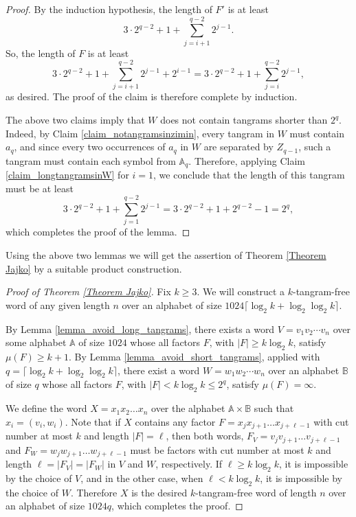 \documentclass[12pt]{amsart}
\theoremstyle{plain}
\numberwithin{equation}{section}
\begin{document}
\begin{proof}
	By the induction hypothesis, the length of $F'$ is at least $$3\cdot 2^{q-2} + 1 + \sum_{j=i+1}^{q-2}2^{j-1}.$$ So, the length of $F$ is at least $$3\cdot 2^{q-2} + 1 + \sum_{j=i+1}^{q-2}2^{j-1} + 2^{i-1} = 3\cdot 2^{q-2} + 1 + \sum_{j=i}^{q-2}2^{j-1},$$ as desired. The proof of the claim is therefore complete by induction.
	
	The above two claims imply that $W$ does not contain tangrams shorter than $2^q$. Indeed, by Claim \ref{claim_notangramsinzimin}, every tangram in $W$ must contain $a_q$, and since every two occurrences of $a_q$ in $W$ are separated by $Z_{q-1}$, such a tangram must contain each symbol from $\mathbb{A}_q$. Therefore, applying Claim \ref{claim_longtangramsinW} for $i=1$, we conclude that the length of this tangram must be at least 
	$$3\cdot 2^{q-2} + 1 + \sum_{j=1}^{q-2}2^{j-1} = 3\cdot 2^{q-2} + 1 + 2^{q-2} - 1 = 2^q,$$
	which completes the proof of the lemma.
\end{proof}

Using the above two lemmas we will get the assertion of Theorem \ref{Theorem Jajko} by a suitable product construction.

\begin{proof}[Proof of Theorem \ref{Theorem Jajko}]
	Fix $k\geqslant3$. We will construct a $k$-tangram-free word of any given length $n$ over an alphabet of size $1024\lceil\log_2 k + \log_2\log_2 k\rceil$.
	
	By Lemma \ref{lemma_avoid_long_tangrams}, there exists a word $V=v_1v_2\cdots v_n$ over some alphabet $\mathbb{A}$ of size $1024$ whose all factors $F$, with $|F|\geqslant k\log_2 k$, satisfy $\mu(F)\geqslant k+1$. By Lemma \ref{lemma_avoid_short_tangrams}, applied with $q=\lceil\log_2 k + \log_2\log_2 k\rceil$, there exist a word $W=w_1w_2\cdots w_n$ over an alphabet $\mathbb{B}$ of size $q$ whose all factors $F$, with $|F|<k\log_2 k\leqslant 2^q$, satisfy $\mu(F)=\infty$.
	
	We define the word $X=x_1x_2\ldots x_n$ over the alphabet $\mathbb{A} \times \mathbb{B}$ such that $x_i=(v_i, w_i)$. Note that if $X$ contains any factor $F=x_j x_{j+1} \ldots x_{j+\ell -1}$ with cut number at most $k$ and length $|F|=\ell$, then both words, $F_V=v_jv_{j+1}\ldots v_{j+\ell -1}$ and $F_W=w_jw_{j+1}\ldots w_{j+\ell -1}$ must be factors with cut number at most $k$ and length $\ell=|F_V|=|F_W|$ in $V$ and $W$, respectively. If $\ell\geqslant k\log_2 k$, it is impossible by the choice of $V$, and in the other case, when $\ell<k\log_2 k$, it is impossible by the choice of $W$. Therefore $X$ is the desired $k$-tangram-free word of length $n$ over an alphabet of size $1024q$, which completes the proof. 
\end{proof}
\end{document}
